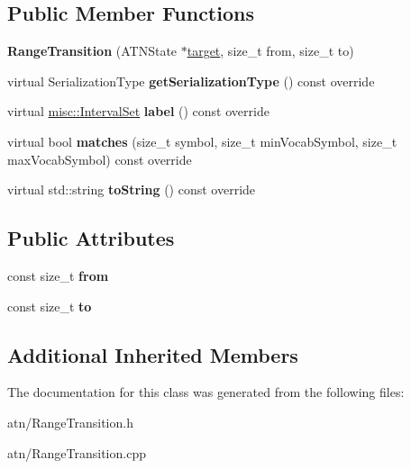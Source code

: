 \subsection*{Public Member Functions}
\begin{DoxyCompactItemize}
\item 
\mbox{\label{classantlr4_1_1atn_1_1RangeTransition_ad2dc0d52c370df3ad3e504f4c941838a}} 
{\bfseries Range\+Transition} (A\+T\+N\+State $\ast$\hyperlink{classantlr4_1_1atn_1_1Transition_aaaed7f4ddda71e156b36de33e88f66a7}{target}, size\+\_\+t from, size\+\_\+t to)
\item 
\mbox{\label{classantlr4_1_1atn_1_1RangeTransition_a8551e27d2cee43d4b8f5127d61071034}} 
virtual Serialization\+Type {\bfseries get\+Serialization\+Type} () const override
\item 
\mbox{\label{classantlr4_1_1atn_1_1RangeTransition_a9a2182967156bb6bd3895e06a944cc66}} 
virtual \hyperlink{classantlr4_1_1misc_1_1IntervalSet}{misc\+::\+Interval\+Set} {\bfseries label} () const override
\item 
\mbox{\label{classantlr4_1_1atn_1_1RangeTransition_ad81b9d5e28e934d76c032bcb7e3eb7c4}} 
virtual bool {\bfseries matches} (size\+\_\+t symbol, size\+\_\+t min\+Vocab\+Symbol, size\+\_\+t max\+Vocab\+Symbol) const override
\item 
\mbox{\label{classantlr4_1_1atn_1_1RangeTransition_af7fafa5d3700cb607bcb029ce25c3914}} 
virtual std\+::string {\bfseries to\+String} () const override
\end{DoxyCompactItemize}
\subsection*{Public Attributes}
\begin{DoxyCompactItemize}
\item 
\mbox{\label{classantlr4_1_1atn_1_1RangeTransition_ac4de64f5aaacba16f5a30801264649b4}} 
const size\+\_\+t {\bfseries from}
\item 
\mbox{\label{classantlr4_1_1atn_1_1RangeTransition_a01d8ac8f8f6ca054ae337b5cf623c3a4}} 
const size\+\_\+t {\bfseries to}
\end{DoxyCompactItemize}
\subsection*{Additional Inherited Members}


The documentation for this class was generated from the following files\+:\begin{DoxyCompactItemize}
\item 
atn/Range\+Transition.\+h\item 
atn/Range\+Transition.\+cpp\end{DoxyCompactItemize}
